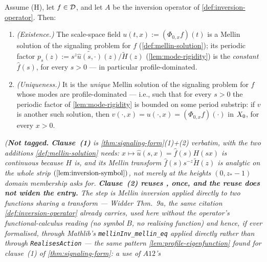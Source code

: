 \begin{corollary}\label{cor:signaling-wellposed}
Assume (H), let $f \in \mathcal{D}$, and let $A$ be the inversion operator of \ref{def:inversion-operator}.
Then:
\begin{enumerate}
\item \emph{(Existence.)} The scale-space field $u(t,x) := (\Phi_{0,x}f)(t)$ is a Mellin solution
of the signaling problem for $f$ (\ref{def:mellin-solution}); its periodic factor
$p_s(z) := s^z\widetilde{\hat u(s,\cdot)}(z)/\tilde H(z)$ (\ref{lem:mode-rigidity}) is the
\emph{constant} $\hat f(s)$, for every $s > 0$ --- in particular profile-dominated.
\item \emph{(Uniqueness.)} It is the \emph{unique} Mellin solution of the signaling problem for
$f$ whose modes are profile-dominated --- i.e., such that for every $s > 0$ the periodic factor of
\ref{lem:mode-rigidity} is bounded on some period substrip: if $v$ is another such solution, then
$v(\cdot,x) = u(\cdot,x) = (\Phi_{0,x}f)(\cdot)$ in $X_0$, for every $x > 0$.
\end{enumerate}
\statusT\quad\emph{(\textbf{Not tagged.} \textbf{Clause~(1)} is \ref{thm:signaling-form}(1)+(2)
verbatim, with the two additions \ref{def:mellin-solution} needs: $x \mapsto \hat u(s,x) =
\hat f(s)H(sx)$ is continuous because $H$ is, and its Mellin transform $\hat f(s)s^{-z}\tilde H(z)$
is analytic on the whole strip $(\ref{lem:inversion-symbol})$, not merely at the heights
$(0,z_*-1)$ domain membership asks for. \textbf{Clause~(2) reuses , once, and the reuse
does not widen the entry.} The step is Mellin inversion applied directly to two \emph{functions}
sharing a transform --- Widder Thm.~9a, the same citation \ref{def:inversion-operator} already
carries, used here without the operator's functional-calculus reading (no symbol $B$, no realising
function) and hence, if ever formalised, through Mathlib's \texttt{mellinInv\_mellin\_eq} applied
directly rather than through \texttt{RealisesAction} --- the same pattern
\ref{lem:profile-eigenfunction} found for clause~(1) of \ref{thm:signaling-form}: a use of $A12$'s
}
\end{corollary}
